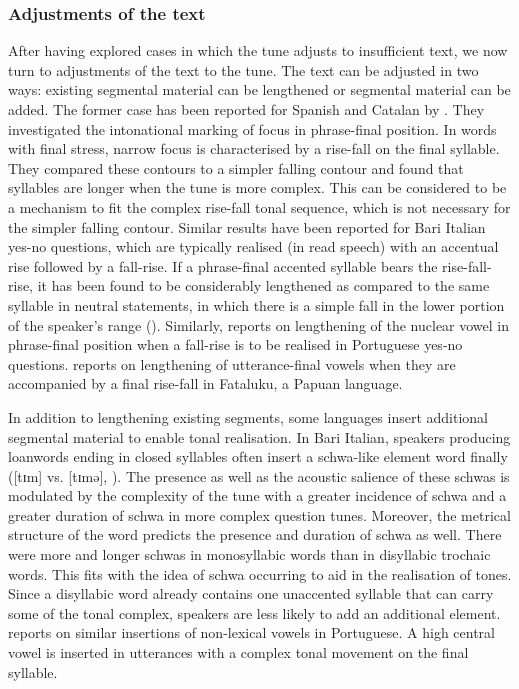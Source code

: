 \subsubsection{Adjustments of the text}
After having explored cases in which the tune adjusts to insufficient text, we now turn to adjustments of the text to the tune. The text can be adjusted in two ways: existing segmental material can be lengthened or segmental material can be added. The former case has been reported for Spanish and Catalan by \citet{PrietoOrtega2009}. They investigated the intonational marking of focus in phrase-final position. In words with final stress, narrow focus is characterised by a rise-fall on the final syllable. They compared these contours to a simpler falling contour and found that syllables are longer when the tune is more complex. This can be considered to be a mechanism to fit the complex rise-fall tonal sequence, which is not necessary for the simpler falling contour. Similar results have been reported for Bari Italian yes-no questions, which are typically realised (in read speech) with an accentual rise followed by a fall-rise. If a phrase-final accented syllable bears the rise-fall-rise, it has been found to be considerably lengthened as compared to the same syllable in neutral statements, in which there is a simple fall in the lower portion of the speaker’s range (\citealt{Grice.etal1997,Refice.etal1997}). Similarly, \citet{Frota2002} reports on lengthening of the nuclear vowel in phrase-final position when a fall-rise is to be realised in Portuguese  yes-no questions. \citet{Heston2014} reports on lengthening of utterance-final vowels when they are accompanied by a final rise-fall in Fataluku, a Papuan language.

In addition to lengthening existing segments, some languages insert additional segmental material to enable tonal realisation. In Bari Italian, speakers producing loanwords ending in closed syllables often insert a schwa-like element word finally ([tɪm] vs. [tɪmə], \citealt{Grice.etal2015bari}). The presence as well as the acoustic salience of these schwas is modulated by the complexity of the tune with a greater incidence of schwa and a greater duration of schwa in more complex question tunes. Moreover, the metrical structure of the word predicts the presence and duration of schwa as well. There were more and longer schwas in monosyllabic words than in disyllabic trochaic words. This fits with the idea of schwa occurring to aid in the realisation of tones. Since a disyllabic word already contains one unaccented syllable that can carry some of the tonal complex, speakers are less likely to add an additional element. \citet{Frota2002} reports on similar insertions of non-lexical vowels in Portuguese. A high central vowel is inserted in utterances with a complex tonal movement on the final syllable.

